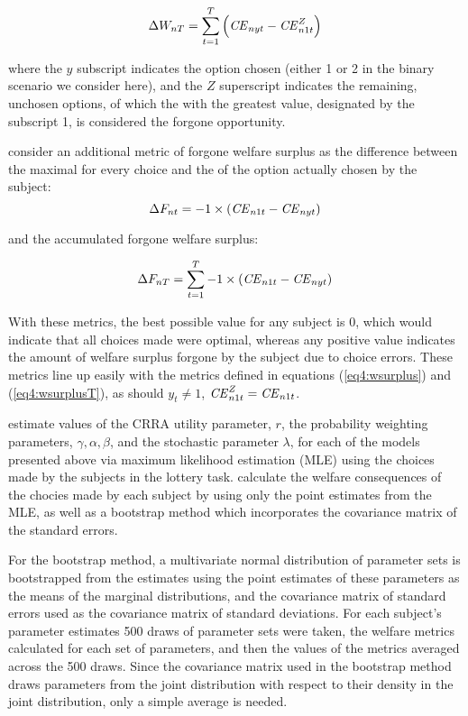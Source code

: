 \documentclass[../main.tex]{subfiles}
\begin{document}
\begin{equation}
	\label{eq4:wsurplusT}
	\Delta W_{nT} = \sum_{t=1}^T \left( {\mathit{CE}}_{nyt} - {\mathit{CE}}_{n1t}^Z \right)
\end{equation}

\noindent where the $y$ subscript indicates the option chosen (either 1 or 2 in the binary scenario we consider here), and the $Z$ superscript indicates the remaining, unchosen options, of which the {\CE} with the greatest value, designated by the subscript 1, is considered the forgone opportunity.

\textcite[106]{Harrison2016} consider an additional metric of forgone welfare surplus as the difference between the maximal {\CE} for every choice and the {\CE} of the option actually chosen by the subject:
\begin{equation}
	\label{eq4:wforgone}
	\Delta F_{nt} = -1 \times \left( {\mathit{CE}}_{n1t} - {\mathit{CE}}_{nyt} \right)
\end{equation}

\noindent and the accumulated forgone welfare surplus:

\begin{equation}
	\label{eq4:wforgoneT}
	\Delta F_{nT} = \sum_{t=1}^T  -1 \times \left( {\mathit{CE}}_{n1t} - {\mathit{CE}}_{nyt} \right)
\end{equation}

\noindent With these metrics, the best possible value for any subject is 0, which would indicate that all choices made were optimal, whereas any positive value indicates the amount of welfare surplus forgone by the subject due to choice errors.
These metrics line up easily with the metrics defined in equations (\ref{eq4:wsurplus}) and (\ref{eq4:wsurplusT}), as should $y_t \neq 1$, ${\mathit{CE}}_{n1t}^Z = {\mathit{CE}}_{n1t}$.

\textcite{Harrison2016} estimate values of the CRRA utility parameter, $r$, the probability weighting parameters, $\gamma, \alpha, \beta$, and the stochastic parameter $\lambda$, for each of the models presented above via maximum likelihood estimation (MLE) using the choices made by the subjects in the lottery task.
\textcite[107,110]{Harrison2016} calculate the welfare consequences of the chocies made by each subject by using only the point estimates from the MLE, as well as a bootstrap method which incorporates the covariance matrix of the standard errors.

For the bootstrap method, a multivariate normal distribution of parameter sets is bootstrapped from the estimates using the point estimates of these parameters as the means of the marginal distributions, and the covariance matrix of standard errors used as the covariance matrix of standard deviations.
For each subject's parameter estimates 500 draws of parameter sets were taken, the welfare metrics calculated for each set of parameters, and then the values of the metrics averaged across the 500 draws.
Since the covariance matrix used in the bootstrap method draws parameters from the joint distribution with respect to their density in the joint distribution, only a simple average is needed.
\end{document}

